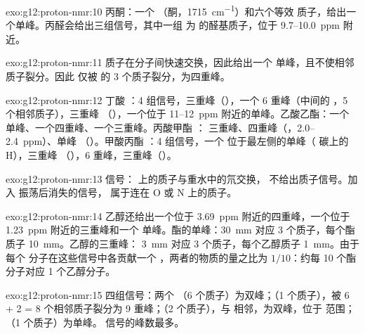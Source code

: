 \begin{solution}{exo:g12:proton-nmr:10}
丙酮：一个 （酮，\qty{1715}{cm^{-1}}）和六个等效
质子，给出一个单峰。丙醛会给出三组信号，其中一组
为  的醛基质子，位于 9.7--\qty{10.0}{ppm} 附近。
\end{solution}

\begin{solution}{exo:g12:proton-nmr:11}
 质子在分子间快速交换，因此给出一个
单峰，且不使相邻质子裂分。因此 
仅被  的 3 个质子裂分，为四重峰。
\end{solution}

\begin{solution}{exo:g12:proton-nmr:12}
丁酸 ：4 组信号，三重峰（），一个
6 重峰（中间的 ，5 个相邻质子），三重峰
（），一个位于 11--\qty{12}{ppm} 附近的单峰。乙酸乙酯：一个
单峰、一个四重峰、一个三重峰。丙酸甲酯 ：
三重峰、四重峰（，2.0--\qty{2.4}{ppm}）、单峰
（）。甲酸丙酯 ：4 组信号，一个
位于最左侧的单峰（ 碳上的 H），三重峰
（），6 重峰，三重峰（）。
\end{solution}

\begin{solution}{exo:g12:proton-nmr:13}
 信号： 上的质子与重水中的氘交换，
 不给出质子信号。加入  振荡后消失的信号，
属于连在 O 或 N 上的质子。
\end{solution}

\begin{solution}{exo:g12:proton-nmr:14}
乙醇还给出一个位于 \qty{3.69}{ppm} 附近的四重峰，一个位于
\qty{1.23}{ppm} 附近的三重峰和一个  单峰。酯的单峰：\qty{30}{mm}
对应 3 个质子，每个酯质子 \qty{10}{mm}。乙醇的三重峰：
\qty{3}{mm} 对应 3 个质子，每个乙醇质子 \qty{1}{mm}。由于每个
分子在这些信号中各贡献一个 ，两者的物质的量之比为
$1/10$：约每 10 个酯分子对应 1 个乙醇分子。
\end{solution}

\begin{solution}{exo:g12:proton-nmr:15}
四组信号：两个 （6 个质子）为双峰；（1
个质子），被 6 + 2 = 8 个相邻质子裂分为 9 重峰；（2
个质子），与  相邻，为双峰，位于  范围；
（1 个质子）为单峰。 信号的峰数最多。
\end{solution}

